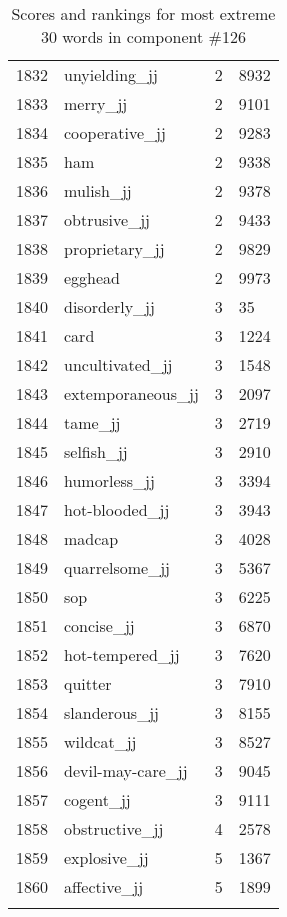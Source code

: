 \begin{longtable}[!htbp]{| rlr@{.}l |}
    1832 & unyielding\_jj & 2 & 8932 \\
    1833 & merry\_jj & 2 & 9101 \\
    1834 & cooperative\_jj & 2 & 9283 \\
    1835 & ham & 2 & 9338 \\
    1836 & mulish\_jj & 2 & 9378 \\
    1837 & obtrusive\_jj & 2 & 9433 \\
    1838 & proprietary\_jj & 2 & 9829 \\
    1839 & egghead & 2 & 9973 \\
    1840 & disorderly\_jj & 3 & 35 \\
    1841 & card & 3 & 1224 \\
    1842 & uncultivated\_jj & 3 & 1548 \\
    1843 & extemporaneous\_jj & 3 & 2097 \\
    1844 & tame\_jj & 3 & 2719 \\
    1845 & selfish\_jj & 3 & 2910 \\
    1846 & humorless\_jj & 3 & 3394 \\
    1847 & hot-blooded\_jj & 3 & 3943 \\
    1848 & madcap & 3 & 4028 \\
    1849 & quarrelsome\_jj & 3 & 5367 \\
    1850 & sop & 3 & 6225 \\
    1851 & concise\_jj & 3 & 6870 \\
    1852 & hot-tempered\_jj & 3 & 7620 \\
    1853 & quitter & 3 & 7910 \\
    1854 & slanderous\_jj & 3 & 8155 \\
    1855 & wildcat\_jj & 3 & 8527 \\
    1856 & devil-may-care\_jj & 3 & 9045 \\
    1857 & cogent\_jj & 3 & 9111 \\
    1858 & obstructive\_jj & 4 & 2578 \\
    1859 & explosive\_jj & 5 & 1367 \\
    1860 & affective\_jj & 5 & 1899 \\
    \hline
    \caption{Scores and rankings for most extreme 30 words in component \#126} \\
\end{longtable}
